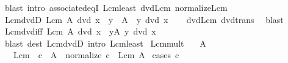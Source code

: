 \begin{isabellebody}
\ {\isacharparenleft}{\kern0pt}blast\ intro{\isacharcolon}{\kern0pt}\ associated{\isacharunderscore}{\kern0pt}eqI\ Lcm{\isacharunderscore}{\kern0pt}least\ dvd{\isacharunderscore}{\kern0pt}Lcm\ normalize{\isacharunderscore}{\kern0pt}Lcm{\isacharparenright}{\kern0pt}%
\endisatagproof
{\isafoldproof}%
%
\isadelimproof
\isanewline
%
\endisadelimproof
\isanewline
{}\isamarkupfalse%
\ Lcm{\isacharunderscore}{\kern0pt}dvdD{\isacharcolon}{\kern0pt}\ {\isachardoublequoteopen}Lcm\ A\ dvd\ x\ {\isasymLongrightarrow}\ y\ {\isasymin}\ A\ {\isasymLongrightarrow}\ y\ dvd\ x{\isachardoublequoteclose}\isanewline
%
\isadelimproof
\ \ %
\endisadelimproof
%
\isatagproof
{}\isamarkupfalse%
\ dvd{\isacharunderscore}{\kern0pt}Lcm\ dvd{\isacharunderscore}{\kern0pt}trans\ \isamarkupfalse%
\ blast%
\endisatagproof
{\isafoldproof}%
%
\isadelimproof
\isanewline
%
\endisadelimproof
\isanewline
{}\isamarkupfalse%
\ Lcm{\isacharunderscore}{\kern0pt}dvd{\isacharunderscore}{\kern0pt}iff{\isacharcolon}{\kern0pt}\ {\isachardoublequoteopen}Lcm\ A\ dvd\ x\ {\isasymlongleftrightarrow}\ {\isacharparenleft}{\kern0pt}{\isasymforall}y{\isasymin}A{\isachardot}{\kern0pt}\ y\ dvd\ x{\isacharparenright}{\kern0pt}{\isachardoublequoteclose}\isanewline
%
\isadelimproof
\ \ %
\endisadelimproof
%
\isatagproof
{}\isamarkupfalse%
\ {\isacharparenleft}{\kern0pt}blast\ dest{\isacharcolon}{\kern0pt}\ Lcm{\isacharunderscore}{\kern0pt}dvdD\ intro{\isacharcolon}{\kern0pt}\ Lcm{\isacharunderscore}{\kern0pt}least{\isacharparenright}{\kern0pt}%
\endisatagproof
{\isafoldproof}%
%
\isadelimproof
\isanewline
%
\endisadelimproof
\isanewline
{}\isamarkupfalse%
\ Lcm{\isacharunderscore}{\kern0pt}mult{\isacharcolon}{\kern0pt}\isanewline
\ \ \ {\isachardoublequoteopen}A\ {\isasymnoteq}\ {\isacharbraceleft}{\kern0pt}{\isacharbraceright}{\kern0pt}{\isachardoublequoteclose}\isanewline
\ \ \ {\isachardoublequoteopen}Lcm\ {\isacharparenleft}{\kern0pt}{\isacharparenleft}{\kern0pt}{\isacharasterisk}{\kern0pt}{\isacharparenright}{\kern0pt}\ c\ {\isacharbackquote}{\kern0pt}\ A{\isacharparenright}{\kern0pt}\ {\isacharequal}{\kern0pt}\ normalize\ {\isacharparenleft}{\kern0pt}c\ {\isacharasterisk}{\kern0pt}\ Lcm\ A{\isacharparenright}{\kern0pt}{\isachardoublequoteclose}\isanewline
%
\isadelimproof
%
\endisadelimproof
%
\isatagproof
{}\isamarkupfalse%
\ {\isacharparenleft}{\kern0pt}cases\ {\isachardoublequoteopen}c\ {\isacharequal}{\kern0pt}\ {}{\isachardoublequoteclose}{\isacharparenright}{\kern0pt}\isanewline

\end{isabellebody}
